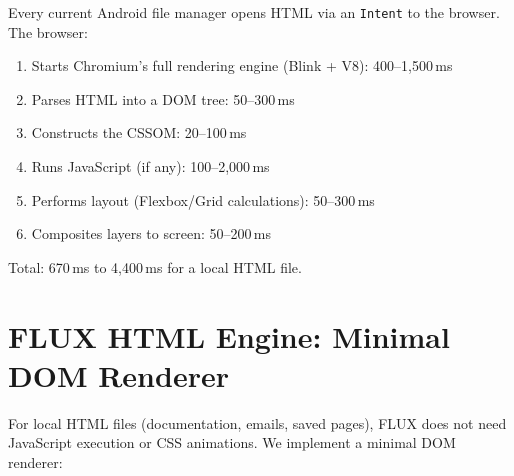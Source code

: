 \documentclass[11pt, a4paper, openright]{report}
\begin{document}
Every current Android file manager opens HTML via an \texttt{Intent} to the browser. The browser:
\begin{enumerate}
  \item Starts Chromium's full rendering engine (Blink + V8): 400--1,500\,ms
  \item Parses HTML into a DOM tree: 50--300\,ms
  \item Constructs the CSSOM: 20--100\,ms
  \item Runs JavaScript (if any): 100--2,000\,ms
  \item Performs layout (Flexbox/Grid calculations): 50--300\,ms
  \item Composites layers to screen: 50--200\,ms
\end{enumerate}

Total: 670\,ms to 4,400\,ms for a local HTML file.

\section{FLUX HTML Engine: Minimal DOM Renderer}

For local HTML files (documentation, emails, saved pages), FLUX does not need JavaScript execution or CSS animations. We implement a minimal DOM renderer:
\end{document}
